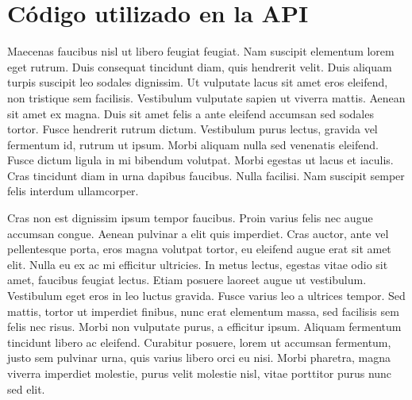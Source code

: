 \chapter{Código utilizado en la API}\label{app:two}
Maecenas faucibus nisl ut libero feugiat feugiat. Nam suscipit elementum lorem eget rutrum. Duis consequat tincidunt diam, quis hendrerit velit. Duis aliquam turpis suscipit leo sodales dignissim. Ut vulputate lacus sit amet eros eleifend, non tristique sem facilisis. Vestibulum vulputate sapien ut viverra mattis. Aenean sit amet ex magna. Duis sit amet felis a ante eleifend accumsan sed sodales tortor. Fusce hendrerit rutrum dictum. Vestibulum purus lectus, gravida vel fermentum id, rutrum ut ipsum. Morbi aliquam nulla sed venenatis eleifend. Fusce dictum ligula in mi bibendum volutpat. Morbi egestas ut lacus et iaculis. Cras tincidunt diam in urna dapibus faucibus. Nulla facilisi. Nam suscipit semper felis interdum ullamcorper.\par

Cras non est dignissim ipsum tempor faucibus. Proin varius felis nec augue accumsan congue. Aenean pulvinar a elit quis imperdiet. Cras auctor, ante vel pellentesque porta, eros magna volutpat tortor, eu eleifend augue erat sit amet elit. Nulla eu ex ac mi efficitur ultricies. In metus lectus, egestas vitae odio sit amet, faucibus feugiat lectus. Etiam posuere laoreet augue ut vestibulum. Vestibulum eget eros in leo luctus gravida. Fusce varius leo a ultrices tempor. Sed mattis, tortor ut imperdiet finibus, nunc erat elementum massa, sed facilisis sem felis nec risus. Morbi non vulputate purus, a efficitur ipsum. Aliquam fermentum tincidunt libero ac eleifend. Curabitur posuere, lorem ut accumsan fermentum, justo sem pulvinar urna, quis varius libero orci eu nisi. Morbi pharetra, magna viverra imperdiet molestie, purus velit molestie nisl, vitae porttitor purus nunc sed elit. 